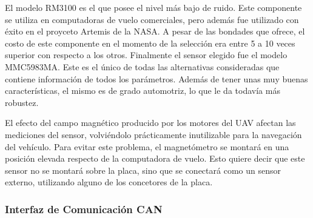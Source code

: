 El modelo RM3100 es el que posee el nivel más bajo de ruido. Este componente se utiliza en computadoras de vuelo comerciales, pero además fue utilizado con éxito en el proyceto Artemis de la NASA. A pesar de las bondades que ofrece, el costo de este componente en el momento de la selección era entre 5 a 10 veces superior con respecto a los otros. Finalmente el sensor elegido fue el modelo MMC5983MA. Este es el único de todas las alternativas consideradas que contiene información de todos los parámetros. Además de tener unas muy buenas características, el mismo es de grado automotriz, lo que le da todavía más robustez.

El efecto del campo magnético producido por los motores del UAV afectan las mediciones del sensor, volviéndolo prácticamente inutilizable para la navegación del vehículo. Para evitar este problema, el magnetómetro se montará en una posición elevada respecto de la computadora de vuelo. Esto quiere decir que este sensor no se montará sobre la placa, sino que se conectará como un sensor externo, utilizando alguno de los concetores de la placa.

\subsubsection{Interfaz de Comunicación CAN}\label{sec:interfaz_CAN}



